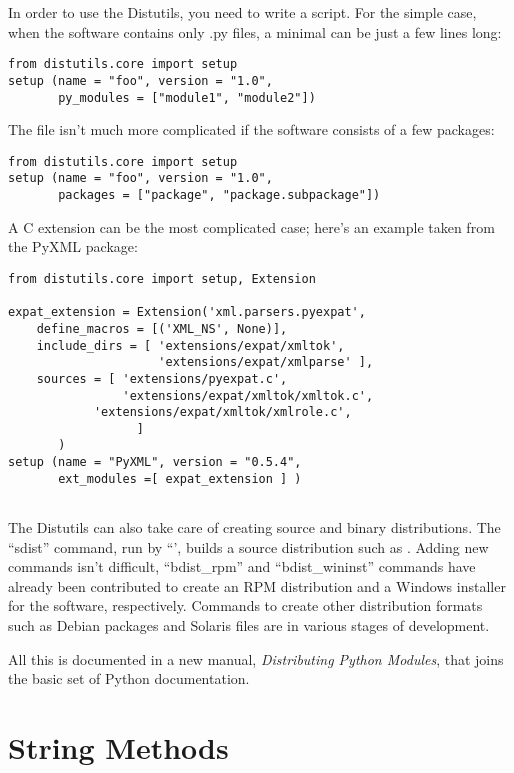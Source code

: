 \documentclass{howto}
\begin{document}
In order to use the Distutils, you need to write a 
script.  For the simple case, when the software contains only .py
files, a minimal  can be just a few lines long:

\begin{verbatim}
from distutils.core import setup
setup (name = "foo", version = "1.0", 
       py_modules = ["module1", "module2"])
\end{verbatim}

The  file isn't much more complicated if the software
consists of a few packages:

\begin{verbatim}
from distutils.core import setup
setup (name = "foo", version = "1.0", 
       packages = ["package", "package.subpackage"])
\end{verbatim}

A C extension can be the most complicated case; here's an example taken from 
the PyXML package:


\begin{verbatim}
from distutils.core import setup, Extension

expat_extension = Extension('xml.parsers.pyexpat',
	define_macros = [('XML_NS', None)],
	include_dirs = [ 'extensions/expat/xmltok',
	                 'extensions/expat/xmlparse' ],
	sources = [ 'extensions/pyexpat.c',
	            'extensions/expat/xmltok/xmltok.c',
 		    'extensions/expat/xmltok/xmlrole.c',
                  ]
       )
setup (name = "PyXML", version = "0.5.4", 
       ext_modules =[ expat_extension ] )
	        
\end{verbatim}

The Distutils can also take care of creating source and binary
distributions.  The ``sdist'' command, run by ``', builds a source distribution such as .
Adding new commands isn't difficult, ``bdist_rpm'' and
``bdist_wininst'' commands have already been contributed to create an
RPM distribution and a Windows installer for the software,
respectively.  Commands to create other distribution formats such as
Debian packages and Solaris  files are in various stages of
development.

All this is documented in a new manual, \textit{Distributing Python
Modules}, that joins the basic set of Python documentation.

\section{String Methods}
\end{document}
